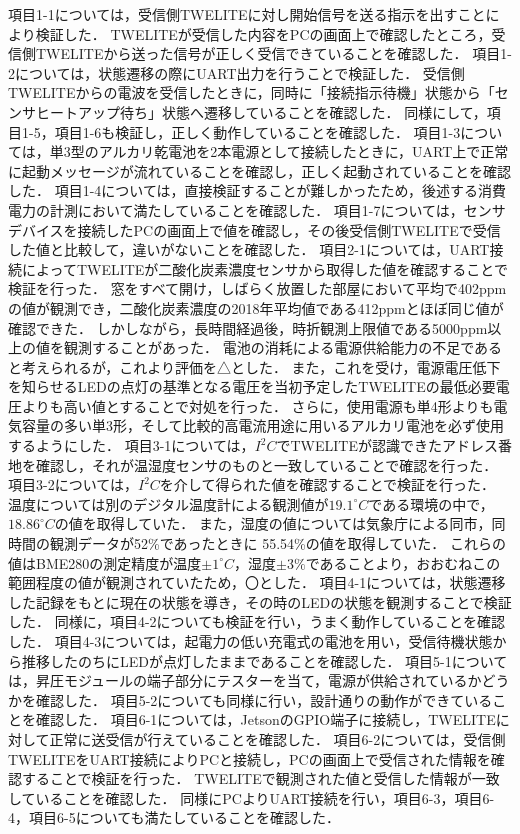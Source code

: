 項目1-1については，受信側TWELITEに対し開始信号を送る指示を出すことにより検証した．
TWELITEが受信した内容をPCの画面上で確認したところ，受信側TWELITEから送った信号が正しく受信できていることを確認した．
項目1-2については，状態遷移の際にUART出力を行うことで検証した．
受信側TWELITEからの電波を受信したときに，同時に「接続指示待機」状態から「センサヒートアップ待ち」状態へ遷移していることを確認した．
同様にして，項目1-5，項目1-6も検証し，正しく動作していることを確認した．
項目1-3については，単3型のアルカリ乾電池を2本電源として接続したときに，UART上で正常に起動メッセージが流れていることを確認し，正しく起動されていることを確認した．
項目1-4については，直接検証することが難しかったため，後述する消費電力の計測において満たしていることを確認した．
項目1-7については，センサデバイスを接続したPCの画面上で値を確認し，その後受信側TWELITEで受信した値と比較して，違いがないことを確認した．
項目2-1については，UART接続によってTWELITEが二酸化炭素濃度センサから取得した値を確認することで検証を行った．
窓をすべて開け，しばらく放置した部屋において平均で402ppmの値が観測でき，二酸化炭素濃度の2018年平均値である412ppm\cite{co2_ave}とほぼ同じ値が確認できた．
しかしながら，長時間経過後，時折観測上限値である5000ppm以上の値を観測することがあった．
電池の消耗による電源供給能力の不足であると考えられるが，これより評価を△とした．
また，これを受け，電源電圧低下を知らせるLEDの点灯の基準となる電圧を当初予定したTWELITEの最低必要電圧よりも高い値とすることで対処を行った．
さらに，使用電源も単4形よりも電気容量の多い単3形，そして比較的高電流用途に用いるアルカリ電池を必ず使用するようにした．
項目3-1については，$I^2C$でTWELITEが認識できたアドレス番地を確認し，それが温湿度センサのものと一致していることで確認を行った．
項目3-2については，$I^2C$を介して得られた値を確認することで検証を行った．
温度については別のデジタル温度計による観測値が$19.1 ^\circ C$である環境の中で，$18.86^\circ C$の値を取得していた．
また，湿度の値については気象庁による同市，同時間の観測データ\cite{amedas}が52\%であったときに%
55.54\%の値を取得していた．
これらの値はBME280の測定精度が温度$\pm{1}^\circ C$，湿度$\pm{3}\%$であることより，おおむねこの範囲程度の値が観測されていたため，〇とした．
項目4-1については，状態遷移した記録をもとに現在の状態を導き，その時のLEDの状態を観測することで検証した．
同様に，項目4-2についても検証を行い，うまく動作していることを確認した．
項目4-3については，起電力の低い充電式の電池を用い，受信待機状態から推移したのちにLEDが点灯したままであることを確認した．
項目5-1については，昇圧モジュールの端子部分にテスターを当て，電源が供給されているかどうかを確認した．
項目5-2についても同様に行い，設計通りの動作ができていることを確認した．
項目6-1については，JetsonのGPIO端子に接続し，TWELITEに対して正常に送受信が行えていることを確認した．
項目6-2については，受信側TWELITEをUART接続によりPCと接続し，PCの画面上で受信された情報を確認することで検証を行った．
TWELITEで観測された値と受信した情報が一致していることを確認した．
同様にPCよりUART接続を行い，項目6-3，項目6-4，項目6-5についても満たしていることを確認した．

